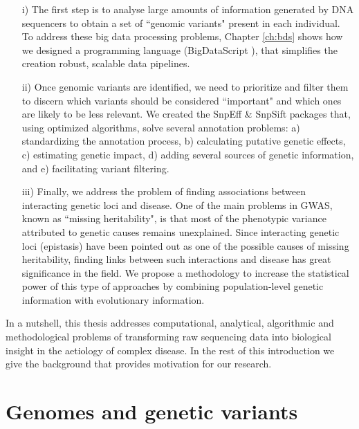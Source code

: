\begin{itemize}

\item[i)] The first step is to analyse large amounts of information generated by DNA sequencers to obtain a set of ``genomic variants" present in each individual. 
To address these big data processing problems, Chapter \ref{ch:bds} shows how we designed a programming language (BigDataScript \cite{cingolani2015bigdatascript}), that simplifies the creation robust, scalable data pipelines.

\item[ii)] Once genomic variants are identified, we need to prioritize and filter them to discern which variants should be considered ``important" and which ones are likely to be less relevant. We created the SnpEff \& SnpSift \cite{cingolani2012program, cingolani2012using} packages that, using optimized algorithms, solve several annotation problems: a) standardizing the annotation process, b) calculating putative genetic effects, c) estimating genetic impact, d) adding several sources of genetic information, and e) facilitating variant filtering. 
					
\item[iii)] Finally, we address the problem of finding associations between interacting genetic loci and disease. One of the main problems in GWAS, known as ``missing heritability", is that most of the phenotypic variance attributed to genetic causes remains unexplained. Since interacting genetic loci (epistasis) have been pointed out as one of the possible causes of missing heritability, finding links between such interactions and disease has great significance in the field. We propose a methodology to increase the statistical power of this type of approaches by combining population-level genetic information with evolutionary information. 

\end{itemize}

In a nutshell, this thesis addresses computational, analytical, algorithmic and methodological problems of transforming raw sequencing data into biological insight in the aetiology of complex disease. In the rest of this introduction we give the background that provides motivation for our research. 

\section{Genomes and genetic variants \label{sec:introRef}}

